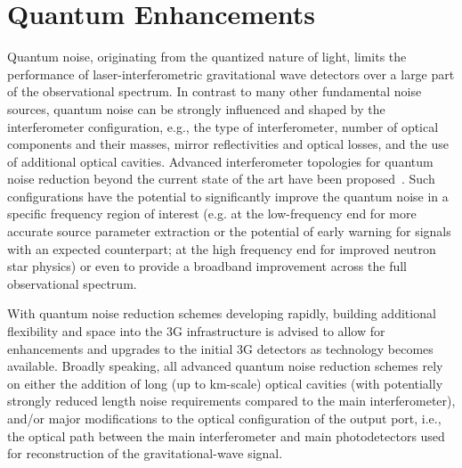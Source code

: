 \chapter{Quantum Enhancements}
\label{sec:Quantum}

Quantum noise, originating from the quantized nature of light, limits the performance of laser-interferometric gravitational wave detectors over a large part of the observational spectrum. In contrast to many other fundamental noise sources, quantum noise can be strongly influenced and shaped by the interferometer configuration, e.g., the type of interferometer, number of optical components and their masses, mirror reflectivities and optical losses, and the use of additional optical cavities. Advanced interferometer topologies for quantum noise reduction beyond the current state of the art have been proposed~\cite{Danilishin:2019dxq}. Such configurations have the potential to significantly improve the quantum noise in a specific frequency region of interest (e.g. at the low-frequency end for more accurate source parameter extraction or the potential of early warning for signals with an expected counterpart; at the high frequency end for improved neutron star physics) or even to provide a broadband improvement across the full observational spectrum. 

With quantum noise reduction schemes developing rapidly, building additional flexibility and space into the 3G infrastructure is advised to allow for enhancements and upgrades to the initial 3G detectors as technology becomes available. 
Broadly speaking, all advanced quantum noise reduction schemes rely on either the addition of long (up to km-scale) optical cavities (with potentially strongly reduced length noise requirements compared to the main interferometer), and/or major modifications to the optical configuration of the output port, i.e., the optical path between the main interferometer and main photodetectors used for reconstruction of the gravitational-wave signal. 

